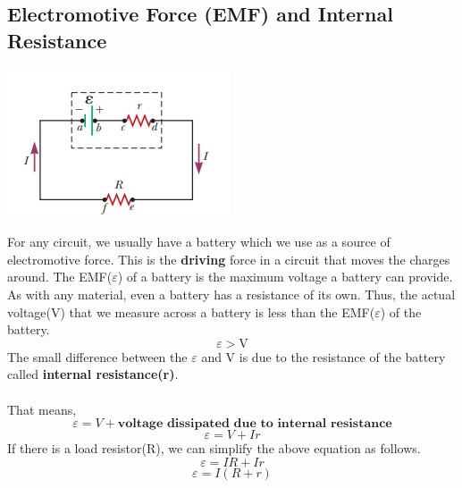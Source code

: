 \documentclass[9pt,addpoints]{exam}
\begin{document}
\subsection*{Electromotive Force (EMF) and Internal Resistance}
\begin{center}
\includegraphics[scale=0.98]{emf.png}	
\end{center}
For any circuit, we usually have a battery which we use as a source of electromotive force. This is the \textbf{driving} force in a circuit that moves the charges around. \newline \newline
The EMF($\varepsilon$) of a battery is the maximum voltage a battery can provide. As with any material, even a battery has a resistance of its own. Thus, the actual voltage(V) that we measure across a battery is less than the EMF($\varepsilon$) of the battery.
$$\varepsilon > \text{V}$$ 
The small difference between the $\varepsilon$ and V is due to the resistance of the battery called \textbf{internal resistance(r)}. \\ \\
That means,
$$\varepsilon = V + \textbf{voltage dissipated due to internal resistance}$$
$$ \varepsilon = V + I r$$
If there is a load resistor(R), we can simplify the above equation as follows.
$$\varepsilon = IR + Ir$$	
$$\varepsilon = I(R + r)$$	
\end{document}
